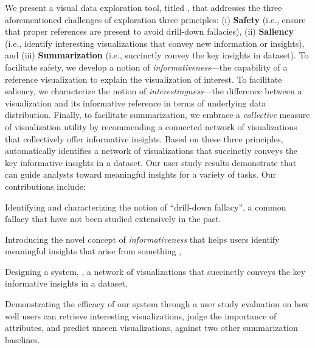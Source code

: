  \par 
 We present a visual data exploration tool, titled \system, 
 that addresses the three aforementioned 
 challenges of exploration 
 three principles: 
 (i) \textbf{Safety} 
 (i.e., ensure that proper 
 references are present to 
 avoid drill-down fallacies), 
 (ii) \textbf{Saliency} 
 (i.e., identify interesting visualizations 
 that convey new information or insights), 
 and (iii) \textbf{Summarization} 
 (i.e., succinctly convey the key 
 insights in  dataset). 
 To facilitate safety, we develop a 
 notion of \emph{informativeness}---the capability 
 of a reference  
 visualization to explain the visualization of interest. 
 To facilitate saliency, 
 we characterize the notion of \emph{interestingness}---the 
 difference between a visualization and 
 its informative reference 
 in terms of underlying data distribution. 
 Finally, to facilitate summarization, 
 we embrace a \emph{collective} measure of 
 visualization utility by recommending a 
 connected network of visualizations that collectively 
 offer informative insights. 
 Based on these three principles, \system automatically identifies a network of visualizations 
 that succinctly conveys the key 
 informative insights in a dataset. 
 Our user study results demonstrate that 
 \system can guide analysts toward meaningful 
 insights for a variety of tasks. 
 Our contributions include:
\begin{denselist}
\item Identifying and characterizing 
the notion of ``drill-down fallacy'', a common fallacy 
that have not been studied extensively in the past.
\item Introducing the novel concept of \emph{informativeness} 
that helps users identify meaningful insights 
that arise from something 
,
\item Designing a system, \system, 
 a network of visualizations that succinctly conveys the key informative insights in a dataset,
\item Demonstrating the efficacy of our system through a user study evaluation on how well users can retrieve interesting visualizations, judge the importance of attributes, and predict unseen visualizations, against two other summarization baselines.
\end{denselist}
